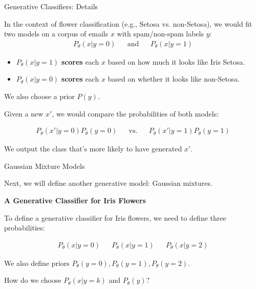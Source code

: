 \documentclass[../../generative_classifiers.tex]{subfiles}
\begin{document}
\begin{frame}[fragile]{Generative Classifiers: Details}

In the context of flower classification (e.g., Setosa vs. non-Setosa), we would fit two models on a corpus of emails $x$ with spam/non-spam labels $y$:
\begin{align*}
P_\theta(x|y=\text{0}) && \text{and} && P_\theta(x|y=\text{1})
\end{align*}

\begin{itemize}
    \item $P_\theta(x | y=1)$ \textbf{scores} each $x$ based on how much it looks like Iris Setosa.
    \item $P_\theta(x | y=0)$ \textbf{scores} each $x$ based on whether it looks like non-Setosa.
\end{itemize}
We also choose a prior $P(y)$.

Given a new $x'$, we would compare the probabilities of both models:

\begin{align*}
P_\theta(x'|y=\text{0})P_\theta(y=\text{0}) && \text{vs.} && P_\theta(x'|y=\text{1})P_\theta(y=\text{1})
\end{align*}

We output the class that's more likely to have generated $x'$.
\end{frame}

\begin{frame}[fragile]{Gaussian Mixture Models}

Next, we will define another generative model: Gaussian mixtures.

\vspace{0.3cm}

\textbf{A Generative Classifier for Iris Flowers}

To define a generative classifier for Iris flowers, we need to define three probabilities:

\begin{align*}
P_\theta(x|y=\text{0}) && P_\theta(x|y=\text{1}) && P_\theta(x|y=\text{2})
\end{align*}

We also define priors $P_\theta(y=\text{0}), P_\theta(y=\text{1}), P_\theta(y=\text{2})$.

How do we choose $P_\theta(x|y=k)$ and $P_\theta(y)$?

\end{frame}
\end{document}
